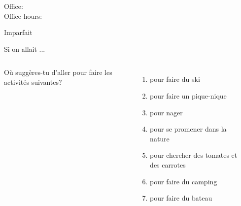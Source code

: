 \documentclass{beamer}
\subtitle[Nature et imparfait]{La nature est l'imparfait}
\begin{document}
  \begin{frame}
    \titlepage
    \tiny{Office: \\
          Office hours: }
  \end{frame}

  \begin{frame}{Imparfait}
    \begin{center}
      
    \end{center}
  \end{frame}

  \begin{frame}{Si on allait ...}
    \begin{columns}
        Où suggères-tu d'aller pour faire les activités suivantes?
        \begin{enumerate}
          \item pour faire du ski
          \item<2-> pour faire un pique-nique
          \item<3-> pour nager
          \item<4-> pour se promener dans la nature
          \item<5-> pour chercher des tomates et des carrotes
          \item<6-> pour faire du camping
          \item<7-> pour faire du bateau
        \end{enumerate}
        \begin{minipage}[t][0.6\textheight]{\linewidth}
          \begin{center}
          \end{center}
        \end{minipage}
    \end{columns}
  \end{frame}
\end{document}
